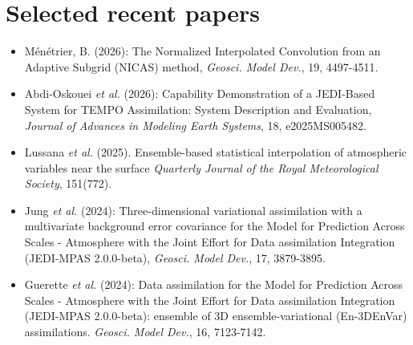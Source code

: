 \documentclass[a4paper,9pt]{scrreprt}
\begin{document}
\section*{Selected recent papers}

\begin{itemize}
\item Ménétrier, B. (2026): The Normalized Interpolated Convolution from an Adaptive Subgrid (NICAS) method, \textit{Geosci. Model Dev.}, 19, 4497-4511.\vspace{-0.12cm}
\item Abdi-Oskouei \textit{et al.} (2026): Capability Demonstration of a JEDI-Based System for TEMPO Assimilation: System Description and Evaluation, \textit{Journal of Advances in Modeling Earth Systems}, 18, e2025MS005482.\vspace{-0.12cm}
\item Lussana \textit{et al.} (2025). Ensemble-based statistical interpolation of atmospheric variables near the surface \textit{Quarterly Journal of the Royal Meteorological Society}, 151(772).\vspace{-0.12cm}
\item Jung \textit{et al.} (2024): Three-dimensional variational assimilation with a multivariate background error covariance for the Model for Prediction Across Scales - Atmosphere with the Joint Effort for Data assimilation Integration (JEDI-MPAS 2.0.0-beta), \textit{Geosci. Model Dev.}, 17, 3879-3895.\vspace{-0.12cm}
\item Guerette \textit{et al.} (2024): Data assimilation for the Model for Prediction Across Scales - Atmosphere with the Joint Effort for Data assimilation Integration (JEDI-MPAS 2.0.0-beta): ensemble of 3D ensemble-variational (En-3DEnVar) assimilations. \textit{Geosci. Model Dev.}, 16, 7123-7142.
\end{itemize}
\end{document}
